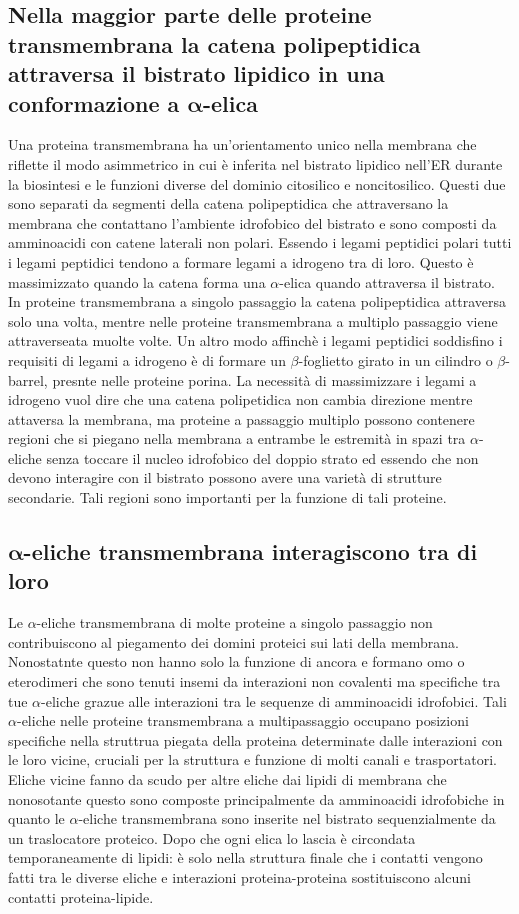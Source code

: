 \subsection{Nella maggior parte delle proteine transmembrana la catena polipeptidica attraversa il bistrato lipidico in una conformazione a $\mathbf{\alpha}$-elica}
Una proteina transmembrana ha un'orientamento unico nella membrana che riflette il modo asimmetrico in cui \`e inferita nel bistrato lipidico nell'ER durante la biosintesi e le 
funzioni diverse del dominio citosilico e noncitosilico. Questi due sono separati da segmenti della catena polipeptidica che attraversano la membrana che contattano l'ambiente 
idrofobico del bistrato e sono composti da amminoacidi con catene laterali non polari. Essendo i legami peptidici polari tutti i legami peptidici tendono a formare legami a idrogeno tra
di loro. Questo \`e massimizzato quando la catena forma una $\alpha$-elica quando attraversa il bistrato. In proteine transmembrana a singolo passaggio la catena polipeptidica attraversa
solo una volta, mentre nelle proteine transmembrana a multiplo passaggio viene attraverseata muolte volte. Un altro modo affinch\`e i legami peptidici soddisfino i requisiti di 
legami a idrogeno \`e di formare un $\beta$-foglietto girato in un cilindro o $\beta$-barrel, presnte nelle proteine porina. La necessit\`a di massimizzare i legami a idrogeno vuol dire
che una catena polipetidica non cambia direzione mentre attaversa la membrana, ma proteine a passaggio multiplo possono contenere regioni che si piegano nella membrana a entrambe le 
estremit\`a in spazi tra $\alpha$-eliche senza toccare il nucleo idrofobico del doppio strato ed essendo che non devono interagire con il bistrato possono avere una variet\`a di 
strutture secondarie. Tali regioni sono importanti per la funzione di tali proteine. 
\subsection{$\mathbf{\alpha}$-eliche transmembrana interagiscono tra di loro}
Le $\alpha$-eliche transmembrana di molte proteine a singolo passaggio non contribuiscono al piegamento dei domini proteici sui lati della membrana. Nonostatnte questo non hanno solo
la funzione di ancora e formano omo o eterodimeri che sono tenuti insemi da interazioni non covalenti ma specifiche tra tue $\alpha$-eliche grazue alle interazioni  tra le sequenze di
amminoacidi idrofobici. Tali $\alpha$-eliche nelle proteine transmembrana a multipassaggio occupano posizioni specifiche nella struttrua piegata della proteina determinate dalle 
interazioni con le loro vicine, cruciali per la struttura e funzione di molti canali e trasportatori. Eliche vicine fanno da scudo per altre eliche dai lipidi di membrana che nonosotante
questo sono composte principalmente da amminoacidi idrofobiche in quanto le $\alpha$-eliche transmembrana sono inserite nel bistrato sequenzialmente da un traslocatore proteico. Dopo
che ogni elica lo lascia \`e circondata temporaneamente di lipidi: \`e solo nella struttura finale che i contatti vengono fatti tra le diverse eliche e interazioni proteina-proteina
sostituiscono alcuni contatti proteina-lipide.
